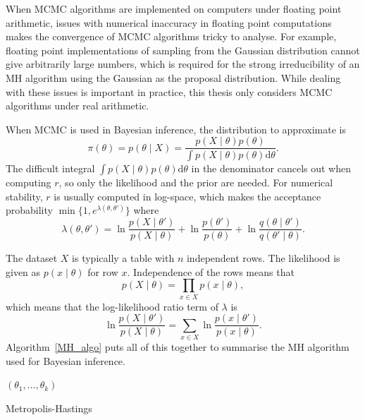 \documentclass[english,twoside,openright]{HYgraduMLDS}
\newcommand{\dx}{\mathrm{d}}
\begin{document}
When MCMC algorithms are implemented on computers under floating point
arithmetic, issues with numerical inaccuracy in floating point computations
makes the convergence of MCMC algorithms tricky to analyse. For example,
floating point implementations of sampling from the Gaussian distribution cannot give
arbitrarily large numbers, which is required for the strong irreducibility
of an MH algorithm using the Gaussian as the proposal distribution.
While dealing with these issues is important in practice, this thesis only
considers MCMC algorithms under real arithmetic.

When MCMC is used in Bayesian inference, the distribution to approximate is 
\[
    \pi(\theta) = p(\theta \mid X) = \frac{p(X \mid \theta)p(\theta)}
    {\int p(X\mid \theta)p(\theta)\dx\theta}.
\]
The difficult integral \(\int p(X\mid \theta)p(\theta)\dx\theta\) in the denominator
cancels out when computing \(r\), so only the likelihood and the prior are needed. 
For numerical stability, \(r\) is usually computed in 
log-space, which makes the acceptance probability
\(\min\{1, e^{\lambda(\theta, \theta')}\}\) where 
\begin{equation}\label{lambda_equation}
    \lambda(\theta, \theta') = \ln \frac{p(X\mid \theta')}{p(X\mid \theta)}
    + \ln \frac{p(\theta')}{p(\theta)}
    + \ln \frac{q(\theta\mid \theta')}{q(\theta'\mid \theta)}.
\end{equation}

The dataset \(X\) is typically a table with \(n\) independent rows.
The likelihood is given as \(p(x\mid \theta)\)
for row \(x\). Independence of the rows means that
\[
    p(X\mid \theta) = \prod_{x\in X} p(x\mid \theta),
\]
which means that the log-likelihood ratio term of \(\lambda\) is
\[
    \ln \frac{p(X\mid \theta')}{p(X\mid \theta)}
    = \sum_{x\in X} \ln\frac{p(x\mid \theta')}{p(x\mid \theta)}.
\]
Algorithm~\ref{MH_algo} puts all of this together to summarise the MH 
algorithm used for Bayesian inference.

\begin{algorithm}[h]
  \Return \((\theta_1, \dotsc, \theta_k)\)
  \caption{Metropolis-Hastings}
  \label{MH_algo}
\end{algorithm}
\end{document}
